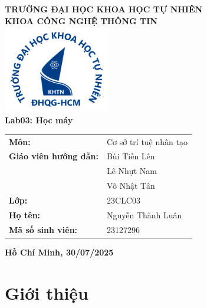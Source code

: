 \documentclass[12pt, a4paper]{article}
\begin{document}
\begin{titlepage}
    \centering
    \fontsize{16pt}{18pt}\selectfont
    \textbf{TRƯỜNG ĐẠI HỌC KHOA HỌC TỰ NHIÊN} \\
    \textbf{KHOA CÔNG NGHỆ THÔNG TIN} \\[1cm]

    \includegraphics[width=0.35\textwidth]{img/logohcmus.png} \\[1cm]

    {\fontsize{24pt}{26pt}\selectfont \textbf{Lab03: Học máy}} \\[1cm]

    \vspace{0.5cm}

    \begin{center}
        \renewcommand{\arraystretch}{1.2}
        \begin{tabular}{@{}ll}
            \textbf{Môn:} & Cơ sở trí tuệ nhân tạo \\[13pt]
            \textbf{Giáo viên hướng dẫn:} & Bùi Tiến Lên \\ 
                                          & Lê Nhựt Nam \\
                                          & Võ Nhật Tân\\[13pt]
            \textbf{Lớp:} & 23CLC03 \\[13pt]
            \textbf{Họ tên:} & Nguyễn Thành Luân \\[13pt]
            \textbf{Mã số sinh viên:} & 23127296 \\[13pt]
        \end{tabular}
    \end{center}

    \vfill

    {\Large \textbf{Hồ Chí Minh, 30/07/2025}}

\end{titlepage}


\tableofcontents  
\newpage         


\section{Giới thiệu}
\end{document}
